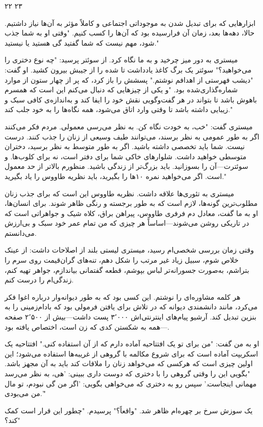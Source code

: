 ۲۲ ۲۳

ابزارهایی که برای تبدیل شدن به موجوداتی اجتماعی و کاملاً مؤثر به آن‌ها نیاز داشتیم. حالا، دهه‌ها بعد، زمان آن فرارسیده بود که آن‌ها را کسب کنیم. "وقتی او به شما جذب شود، مهم نیست که شما گفتید گی هستید یا نیستید."

میستری به دور میز چرخید و به ما نگاه کرد. از سوئتر پرسید: "چه نوع دختری را می‌خواهید؟" سوئتر یک برگ کاغذ یادداشت تا شده را از جیبش بیرون کشید. او گفت: "دیشب فهرستی از اهدافم نوشتم." پسشش را باز کرد، که پر از چهار ستون از موارد شماره‌گذاری‌شده بود. "و یکی از چیزهایی که دنبال می‌کنم این است که همسرم باهوش باشد تا بتواند در هر گفت‌وگویی نقش خود را ایفا کند و به‌اندازه‌ی کافی سبک و زیبایی داشته باشد تا وقتی وارد اتاق می‌شود، همه نگاه‌ها را به خود جلب کند."

میستری گفت: "خب، به خودت نگاه کن. به نظر می‌رسی معمولی. مردم فکر می‌کنند اگر به طور عمومی به نظر برسند، می‌توانند طیف وسیعی از زنان را جذب کنند. درست نیست. شما باید تخصصی داشته باشید. اگر به طور متوسط به نظر برسید، دختران متوسطی خواهید داشت. شلوارهای خاکی شما برای دفتر است، نه برای کلوب‌ها. و سوئترت—آن را بسوزانید. باید بزرگ‌تر از زندگی باشید. منظورم بالاتر از حد معمول است. اگر می‌خواهید نمره ۱۰‌ها را بگیرید، باید نظریه طاووس را یاد بگیرید."

میستری به تئوری‌ها علاقه داشت. نظریه طاووس این است که برای جذب زنان مطلوب‌ترین گونه‌ها، لازم است که به طور برجسته و رنگی ظاهر شوند. برای انسان‌ها، او به ما گفت، معادل دم فرفری طاووس، پیراهن براق، کلاه شیک و جواهراتی است که در تاریکی روشن می‌شوند—اساساً هر چیزی که من تمام عمر خود سبک و بی‌ارزش می‌دانستم.

وقتی زمان بررسی شخصی‌ام رسید، میستری لیستی بلند از اصلاحات داشت: از عینک خلاص شوم، سبیل زیاد غیر مرتب را شکل دهم، تنه‌های گران‌قیمت روی سرم را بتراشم، به‌صورت جسورانه‌تر لباس بپوشم، قطعه‌ گفتمانی بیاندازم، جواهر تهیه کنم، زندگی‌ام را درست کنم.

هر کلمه مشاوره‌ای را نوشتم. این کسی بود که به طور دیوانه‌وار درباره اغوا فکر می‌کرد، مانند دانشمندی دیوانه که در تلاش برای یافتن فرمولی بود که بادام‌زمینی را به بنزین تبدیل کند. آرشیو پیام‌های اینترنتی‌اش ۳٬۰۰۰ پست داشت—بیش از ۲٬۵۰۰ صفحه—همه به شکستن کدی که زن است، اختصاص یافته بود.

او به من گفت: "من برای تو یک افتتاحیه آماده دارم که از آن استفاده کنی." افتتاحیه یک اسکریپت آماده است که برای شروع مکالمه با گروهی از غریبه‌ها استفاده می‌شود؛ این اولین چیزی است که هرکسی که می‌خواهد زنان را ملاقات کند باید به آن مجهز باشد. "بگویی این را وقتی گروهی را با دختری که دوست داری ببینی: 'هی، به نظر می‌رسد مهمانی اینجاست.' سپس رو به دختری که می‌خواهی بگویی: 'اگر من گی نبودم، تو مال من می‌بودی.'"

یک سوزش سرخ بر چهره‌ام ظاهر شد. "واقعاً؟" پرسیدم. "چطور این قرار است کمک کند؟"